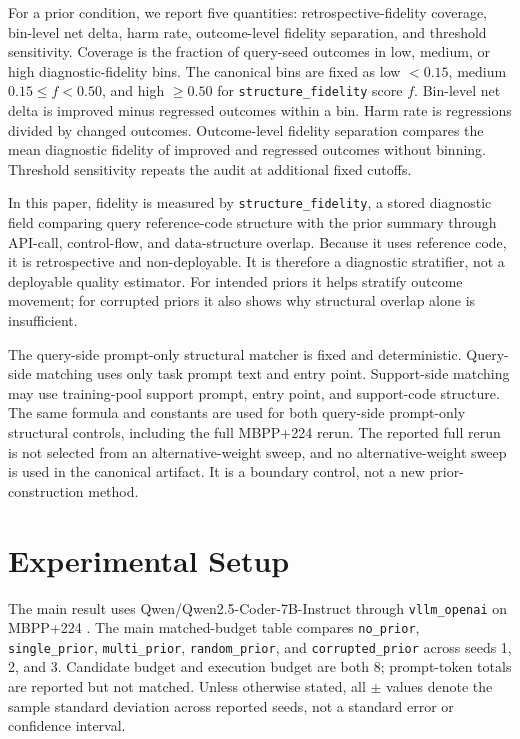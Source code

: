 \documentclass{article}
\begin{document}
For a prior condition, we report five quantities: retrospective-fidelity coverage, bin-level net delta, harm rate, outcome-level fidelity separation, and threshold sensitivity. Coverage is the fraction of query-seed outcomes in low, medium, or high diagnostic-fidelity bins. The canonical bins are fixed as low $<0.15$, medium $0.15\leq f<0.50$, and high $\geq0.50$ for \texttt{structure\_fidelity} score $f$. Bin-level net delta is improved minus regressed outcomes within a bin. Harm rate is regressions divided by changed outcomes. Outcome-level fidelity separation compares the mean diagnostic fidelity of improved and regressed outcomes without binning. Threshold sensitivity repeats the audit at additional fixed cutoffs.

In this paper, fidelity is measured by \texttt{structure\_fidelity}, a stored diagnostic field comparing query reference-code structure with the prior summary through API-call, control-flow, and data-structure overlap. Because it uses reference code, it is retrospective and non-deployable. It is therefore a diagnostic stratifier, not a deployable quality estimator. For intended priors it helps stratify outcome movement; for corrupted priors it also shows why structural overlap alone is insufficient.

The query-side prompt-only structural matcher is fixed and deterministic. Query-side matching uses only task prompt text and entry point. Support-side matching may use training-pool support prompt, entry point, and support-code structure. The same formula and constants are used for both query-side prompt-only structural controls, including the full MBPP+224 rerun. The reported full rerun is not selected from an alternative-weight sweep, and no alternative-weight sweep is used in the canonical artifact. It is a boundary control, not a new prior-construction method.

\section{Experimental Setup}
The main result uses Qwen/Qwen2.5-Coder-7B-Instruct through \texttt{vllm\_openai} on MBPP+224 \citep{hui2024qwen25coder}. The main matched-budget table compares \texttt{no\_prior}, \texttt{single\_prior}, \texttt{multi\_prior}, \texttt{random\_prior}, and \texttt{corrupted\_prior} across seeds 1, 2, and 3. Candidate budget and execution budget are both 8; prompt-token totals are reported but not matched. Unless otherwise stated, all $\pm$ values denote the sample standard deviation across reported seeds, not a standard error or confidence interval.
\end{document}
